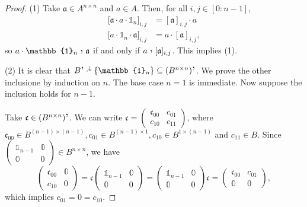 \begin{proof}
(1) Take $\mathfrak{a} \in A^{n\times n}$ and $a\in A$. Then, for all $i,j\in [0:n-1]$,
\begin{align*}
\big[\mathfrak{a}\cdot a \cdot \mathbb{1}_n\big]_{i,j} &= [\mathfrak{a}]_{i,j}\cdot a \\
\big[a \cdot \mathbb{1}_n \cdot \mathfrak{a}\big]_{i,j} &= a\cdot [\mathfrak{a}]_{i,j},
\end{align*}
so $a \cdot \mathbb{1}_n \comm \mathfrak{a}$ if and only if $a\comm [\mathfrak{a}]_{i,j}$. This implies (1).

(2) It is clear that $B^{\comm}\cdot^\imf\{\mathbb{1}_n\} \subseteq (B^{n\times n})^{\comm}$. We prove the other inclusione by induction on $n$. The base case $n=1$ is immediate. Now suppose the inclusion holds for $n-1$.

Take $\mathfrak{c} \in (B^{n\times n})^{\comm}$. We can write $\mathfrak{c} = \begin{pmatrix}
\mathfrak{c}_{00} & c_{01} \\ c_{10} & c_{11}
\end{pmatrix}$, where $\mathfrak{c}_{00} \in B^{(n-1)\times (n-1)}, c_{01}\in B^{(n-1)\times 1}, c_{10} \in B^{1\times (n-1)}$ and $c_{11}\in B$. Since $\begin{pmatrix}
\mathbb{1}_{n-1} & \mathbb{0} \\ \mathbb{0} & 0
\end{pmatrix} \in B^{n\times n}$, we have
\[ \begin{pmatrix}
\mathfrak{c}_{00} & \mathbb{0} \\ c_{10} & 0
\end{pmatrix} = \mathfrak{c}\begin{pmatrix}
\mathbb{1}_{n-1} & \mathbb{0} \\ \mathbb{0} & 0
\end{pmatrix} = \begin{pmatrix}
\mathbb{1}_{n-1} & \mathbb{0} \\ \mathbb{0} & 0
\end{pmatrix}\mathfrak{c} = \begin{pmatrix}
\mathfrak{c}_{00} & c_{01} \\ \mathbb{0} & 0
\end{pmatrix}, \]
which implies $c_{01} = 0 = c_{10}$.


\end{proof}
